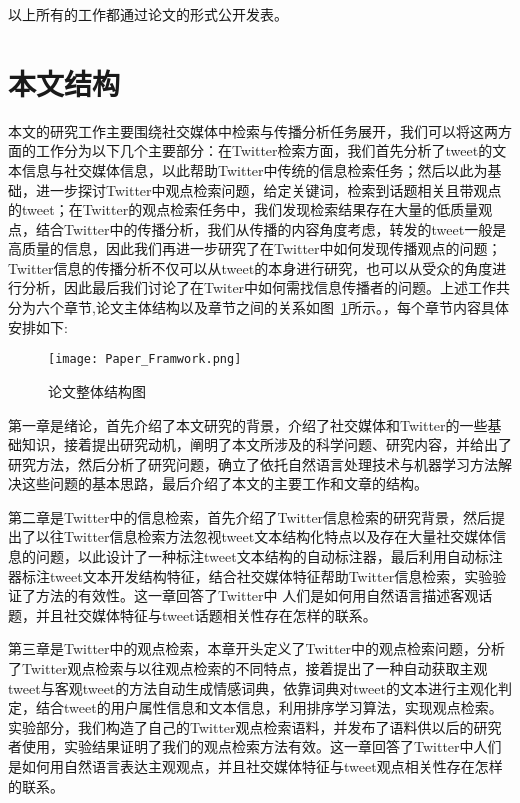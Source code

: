 以上所有的工作都通过论文的形式公开发表。


\section{本文结构}
本文的研究工作主要围绕社交媒体中检索与传播分析任务展开，我们可以将这两方面的工作分为以下几个主要部分：在Twitter检索方面，我们首先分析了tweet的文本信息与社交媒体信息，以此帮助Twitter中传统的信息检索任务；然后以此为基础，进一步探讨Twitter中观点检索问题，给定关键词，检索到话题相关且带观点的tweet；在Twitter的观点检索任务中，我们发现检索结果存在大量的低质量观点，结合Twitter中的传播分析，我们从传播的内容角度考虑，转发的tweet一般是高质量的信息，因此我们再进一步研究了在Twitter中如何发现传播观点的问题；Twitter信息的传播分析不仅可以从tweet的本身进行研究，也可以从受众的角度进行分析，因此最后我们讨论了在Twiter中如何需找信息传播者的问题。上述工作共分为六个章节,论文主体结构以及章节之间的关系如图~\ref{Paper_Framwork}所示。，每个章节内容具体安排如下:

\begin{figure}[htp]
\centering
\texttt{[image: Paper\_Framwork.png]}
\caption{论文整体结构图}
\label{Paper_Framwork}
\end{figure}

第一章是绪论，首先介绍了本文研究的背景，介绍了社交媒体和Twitter的一些基础知识，接着提出研究动机，阐明了本文所涉及的科学问题、研究内容，并给出了研究方法，然后分析了研究问题，确立了依托自然语言处理技术与机器学习方法解决这些问题的基本思路，最后介绍了本文的主要工作和文章的结构。

第二章是Twitter中的信息检索，首先介绍了Twitter信息检索的研究背景，然后提出了以往Twitter信息检索方法忽视tweet文本结构化特点以及存在大量社交媒体信息的问题，以此设计了一种标注tweet文本结构的自动标注器，最后利用自动标注器标注tweet文本开发结构特征，结合社交媒体特征帮助Twitter信息检索，实验验证了方法的有效性。这一章回答了Twitter中
人们是如何用自然语言描述客观话题，并且社交媒体特征与tweet话题相关性存在怎样的联系。

第三章是Twitter中的观点检索，本章开头定义了Twitter中的观点检索问题，分析了Twitter观点检索与以往观点检索的不同特点，接着提出了一种自动获取主观tweet与客观tweet的方法自动生成情感词典，依靠词典对tweet的文本进行主观化判定，结合tweet的用户属性信息和文本信息，利用排序学习算法，实现观点检索。实验部分，我们构造了自己的Twitter观点检索语料，并发布了语料供以后的研究者使用，实验结果证明了我们的观点检索方法有效。这一章回答了Twitter中人们是如何用自然语言表达主观观点，并且社交媒体特征与tweet观点相关性存在怎样的联系。

